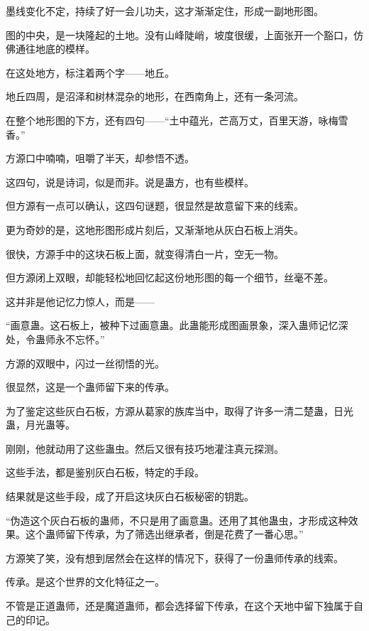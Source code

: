 
\begin{this_body}

墨线变化不定，持续了好一会儿功夫，这才渐渐定住，形成一副地形图。

图的中央，是一块隆起的土地。没有山峰陡峭，坡度很缓，上面张开一个豁口，仿佛通往地底的模样。

在这处地方，标注着两个字——地丘。

地丘四周，是沼泽和树林混杂的地形，在西南角上，还有一条河流。

在整个地形图的下方，还有四句——“土中蕴光，芒高万丈，百里天游，咏梅雪香。”

方源口中喃喃，咀嚼了半天，却参悟不透。

这四句，说是诗词，似是而非。说是蛊方，也有些模样。

但方源有一点可以确认，这四句谜题，很显然是故意留下来的线索。

更为奇妙的是，这地形图形成片刻后，又渐渐地从灰白石板上消失。

很快，方源手中的这块石板上面，就变得清白一片，空无一物。

但方源闭上双眼，却能轻松地回忆起这份地形图的每一个细节，丝毫不差。

这并非是他记忆力惊人，而是——

“画意蛊。这石板上，被种下过画意蛊。此蛊能形成图画景象，深入蛊师记忆深处，令蛊师永不忘怀。”

方源的双眼中，闪过一丝彻悟的光。

很显然，这是一个蛊师留下来的传承。

为了鉴定这些灰白石板，方源从葛家的族库当中，取得了许多一清二楚蛊，日光蛊，月光蛊等。

刚刚，他就动用了这些蛊虫。然后又很有技巧地灌注真元探测。

这些手法，都是鉴别灰白石板，特定的手段。

结果就是这些手段，成了开启这块灰白石板秘密的钥匙。

“伪造这个灰白石板的蛊师，不只是用了画意蛊。还用了其他蛊虫，才形成这种效果。这个蛊师留下传承，为了筛选出继承者，倒是花费了一番心思。”

方源笑了笑，没有想到居然会在这样的情况下，获得了一份蛊师传承的线索。

传承。是这个世界的文化特征之一。

不管是正道蛊师，还是魔道蛊师，都会选择留下传承，在这个天地中留下独属于自己的印记。


\end{this_body}
